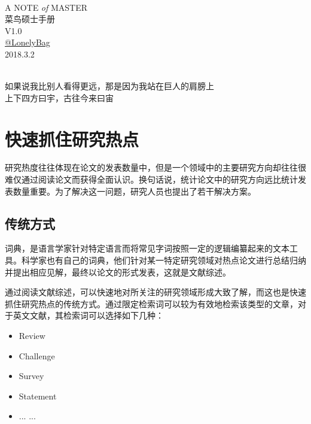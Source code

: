 \documentclass[UTF8]{ctexbook}
\begin{document}
\begin{center}  %
	\quad \\
	\vspace{3cm}
	\hspace{3cm}\Huge{A NOTE {\itshape of} MASTER}\\
	\hspace{3cm}\Huge{菜鸟硕士手册} \\
	\hspace{3cm}\large{V1.0} \\
	\vspace{5cm}
	\hspace{3cm}\href{https://github.com/lonelybag/Latex_lonelybag}{\Large{@LonelyBag}}\\
	\vspace{0.5cm}
	\hspace{3cm}\Large{2018.3.2}
	\clearpage  %
\end{center}

\begin{center}  %
	\quad \\
	\vspace{5cm}
	\LARGE{如果说我比别人看得更远，那是因为我站在巨人的肩膀上}\\
	\LARGE{上下四方曰宇，古往今来曰宙}
	\clearpage  %
\end{center}
\thispagestyle{empty}
\clearpage  %
\tableofcontents
\clearpage
\newpage
\quad
\newpage
\clearpage
\chapter{快速抓住研究热点}
研究热度往往体现在论文的发表数量中，但是一个领域中的主要研究方向却往往很难仅通过阅读论文而获得全面认识。换句话说，统计论文中的研究方向远比统计发表数量重要。为了解决这一问题，研究人员也提出了若干解决方案。

\section{传统方式}
词典，是语言学家针对特定语言而将常见字词按照一定的逻辑编纂起来的文本工具。科学家也有自己的词典，他们针对某一特定研究领域对热点论文进行总结归纳并提出相应见解，最终以论文的形式发表，这就是文献综述。

通过阅读文献综述，可以快速地对所关注的研究领域形成大致了解，而这也是快速抓住研究热点的传统方式。通过限定检索词可以较为有效地检索该类型的文章，对于英文文献，其检索词可以选择如下几种：
\begin{itemize}
	\item Review
	\item Challenge
	\item Survey
	\item Statement
	\item ... ...
\end{itemize}
\end{document}
